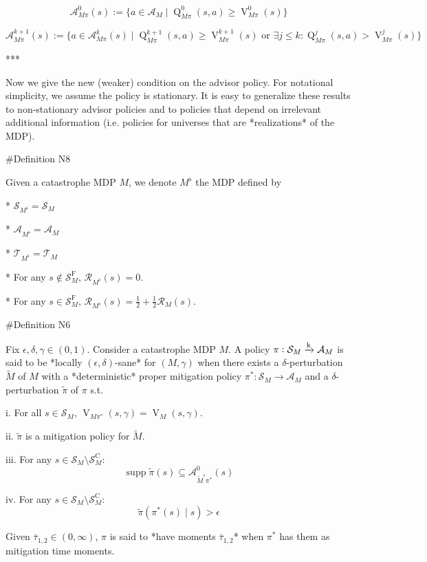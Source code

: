 \documentclass[a4paper]{article}
\DeclareMathOperator{\Supp}{supp}
\newcommand{\AP}[1]{\left(#1\right)}
\newcommand{\M}{\xrightarrow{\textnormal{k}}}
\newcommand{\A}{\mathcal{A}}
\newcommand{\St}{\mathcal{S}}
\newcommand{\T}{\mathcal{T}}
\newcommand{\R}{\mathcal{R}}
\newcommand{\RMC}{\mathrm{C}}
\newcommand{\RMF}{\mathrm{F}}
\newcommand{\SF}{\St^{\RMF}}
\newcommand{\SC}{\St^{\RMC}}
\newcommand{\V}{\operatorname{V}}
\newcommand{\Q}{\operatorname{Q}}
\begin{document}
$$\A_{M\pi}^0(s) := \{a \in \A_M \mid \Q_{M\pi}^0(s,a) \geq \V_{M\pi}^0(s)\}$$

$$\A_{M\pi}^{k+1}(s) := \{a \in \A_{M\pi}^k(s) \mid \Q_{M\pi}^{k+1}(s,a) \geq \V_{M\pi}^{k+1}(s) \text{ or } \exists j \leq k: \Q_{M\pi}^{j}(s,a) > \V_{M\pi}^{j}(s)\}$$

***

Now we give the new (weaker) condition on the advisor policy. For notational simplicity, we assume the policy is stationary. It is easy to generalize these results to non-stationary advisor policies and to policies that depend on irrelevant additional information (i.e. policies for universes that are *realizations* of the MDP).

\#Definition N8

Given a catastrophe MDP $M$, we denote $M^\flat$ the MDP defined by

* $\St_{M^\flat} = \St_M$

* $\A_{M^\flat} = \A_M$

* $\T_{M^\flat} = \T_M$

* For any $s\not\in\SF_M$, $\R_{M^\flat}(s) = 0$.

* For any $s \in \SF_M$, $\R_{M^\flat}(s) = \frac{1}{2} + \frac{1}{2}\R_M(s)$.

\#Definition N6

Fix $\epsilon,\delta,\gamma \in (0,1)$. Consider a catastrophe MDP $M$. A policy $\pi: \St_M \M \A_M$ is said to be *locally $(\epsilon,\delta)$-sane* for $(M,\gamma)$ when there exists a $\delta$-perturbation $\tilde{M}$ of $M$ with a *deterministic* proper mitigation policy $\pi^*: \St_M \rightarrow \A_M$ and a $\delta$-perturbation $\tilde{\pi}$ of $\pi$ s.t.

i. For all $s \in \St_M$, $\V_{M\pi^*}(s,\gamma) = \V_M(s,\gamma)$.

ii. $\tilde{\pi}$ is a mitigation policy for $\tilde{M}$.

iii. For any $s \in \St_M \setminus \SC_M$: $$\Supp{\tilde{\pi}(s)} \subseteq \A_{\tilde{M}^\flat\pi^*}^0(s)$$

iv. For any $s \in \St_M \setminus \SC_M$: $$\tilde{\pi}\AP{\pi^*(s) \mid s} > \epsilon$$


Given $\bar{\tau}_{1,2} \in (0,\infty)$, $\pi$ is said to *have moments $\bar{\tau}_{1,2}$* when $\pi^*$ has them as mitigation time moments.
\end{document}
